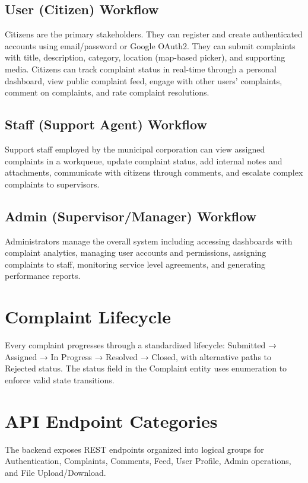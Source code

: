 \documentclass[12pt,a4paper]{report}
\begin{document}
\subsection{User (Citizen) Workflow}
Citizens are the primary stakeholders. They can register and create authenticated accounts using email/password or Google OAuth2. They can submit complaints with title, description, category, location (map-based picker), and supporting media. Citizens can track complaint status in real-time through a personal dashboard, view public complaint feed, engage with other users' complaints, comment on complaints, and rate complaint resolutions.

\subsection{Staff (Support Agent) Workflow}
Support staff employed by the municipal corporation can view assigned complaints in a workqueue, update complaint status, add internal notes and attachments, communicate with citizens through comments, and escalate complex complaints to supervisors.

\subsection{Admin (Supervisor/Manager) Workflow}
Administrators manage the overall system including accessing dashboards with complaint analytics, managing user accounts and permissions, assigning complaints to staff, monitoring service level agreements, and generating performance reports.

\section{Complaint Lifecycle}
Every complaint progresses through a standardized lifecycle: Submitted → Assigned → In Progress → Resolved → Closed, with alternative paths to Rejected status. The status field in the Complaint entity uses enumeration to enforce valid state transitions.

\section{API Endpoint Categories}
The backend exposes REST endpoints organized into logical groups for Authentication, Complaints, Comments, Feed, User Profile, Admin operations, and File Upload/Download.
\end{document}
